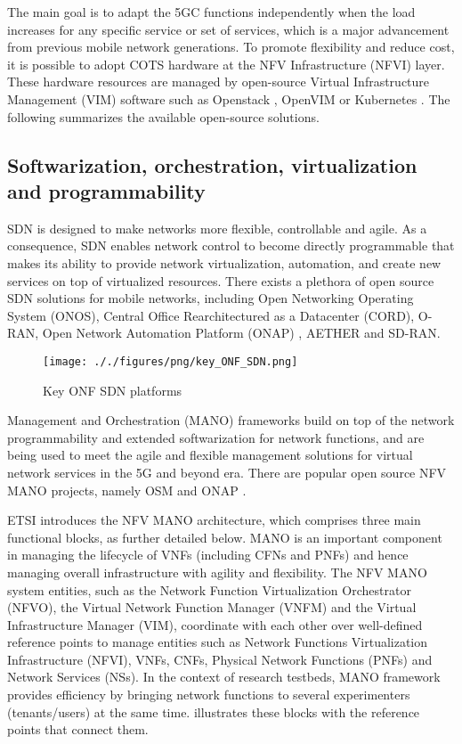 The main goal is to adapt the 5GC functions independently when the load increases for any specific service or set of services, which is a major advancement from previous mobile network generations. To promote flexibility and reduce cost, it is possible to adopt COTS hardware at the NFV Infrastructure (NFVI) layer. These hardware resources are managed by open-source Virtual Infrastructure Management (VIM) software such as Openstack \cite{openstack}, OpenVIM \cite{openvim} or Kubernetes \cite{k8s}. The following  summarizes the available open-source solutions.



\subsection{Softwarization, orchestration, virtualization and programmability}

SDN is designed to make networks more flexible, controllable and agile. As a consequence, SDN enables network control to become directly programmable that makes its ability to provide network virtualization, automation, and create new services on top of virtualized resources. There exists a plethora of open source SDN solutions for mobile networks, including Open Networking Operating System (ONOS), Central Office Rearchitectured as a Datacenter (CORD), O-RAN, Open Network Automation Platform (ONAP) \cite{onap}, AETHER and SD-RAN.

\begin{figure}[!ht]
    \centering
    \texttt{[image: ././figures/png/key\_ONF\_SDN.png]}
	\caption{Key ONF SDN platforms}
	\label{fig:key-ONF-SDN}
\end{figure}

Management and Orchestration (MANO) frameworks \cite{ersue2013etsi} build on top of the network programmability and extended softwarization for network functions, and are being used to meet the agile and flexible management solutions for virtual network services in the 5G and beyond era. There are popular open source NFV MANO projects, namely OSM \cite{osm} and ONAP \cite{onap}.

ETSI introduces the NFV MANO architecture, which comprises three main functional blocks, as further detailed below. MANO is an important component in managing the lifecycle of VNFs (including CFNs and PNFs) and hence managing overall infrastructure with agility and flexibility. The NFV MANO system entities, such as the Network Function Virtualization Orchestrator (NFVO), the Virtual Network Function Manager (VNFM) and the Virtual Infrastructure Manager (VIM), coordinate with each other over well-defined reference points to manage entities such as Network Functions Virtualization Infrastructure (NFVI), VNFs, CNFs, Physical Network Functions (PNFs) and Network Services (NSs). In the context of research testbeds, MANO framework provides efficiency by bringing network functions to several experimenters (tenants/users) at the same time.  illustrates these blocks with the reference points that connect them.

